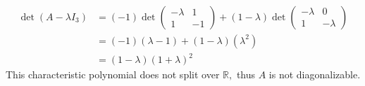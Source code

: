 \begin{enumerate}
\begin{gather}
\end{gather}
\begin{align}
\det{(A-\lambda I_3)} &= (-1)\det{\begin{pmatrix}
-\lambda & 1\\
1 & -1
\end{pmatrix}}
+ (1-\lambda)\det{\begin{pmatrix}
-\lambda & 0\\
1 & -\lambda
\end{pmatrix}}\\
&= (-1)(\lambda -1) + (1-\lambda)(\lambda^2)\\
&= (1-\lambda)(1+\lambda)^2
\end{align}
This characteristic polynomial does not split over $\mathbb{R},$ thus
$A$ is not diagonalizable.
\end{enumerate}
